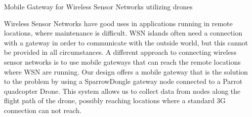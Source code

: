 Mobile Gateway for Wireless Sensor Networks utilizing drones

Wireless Sensor Networks have good uses in applications running in remote locations, where maintenance is difficult. WSN islands often need a connection with a gateway in order to communicate with the outside world, but this cannot be provided in all circumstances.  A different approach to connecting wireless sensor networks is to use mobile gateways that can reach the remote locations where WSN are running. Our design offers a mobile gateway that is the solution to the problem by using a SparrowDongle gateway node connected to a Parrot quadcopter Drone. This system allows us to collect data from nodes along the flight path of the drone, possibly reaching locations where a standard 3G connection can not reach.
